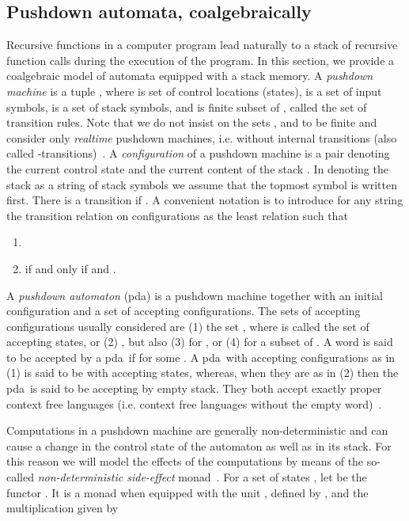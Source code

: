 \documentclass{LMCS}
\begin{document}
\subsection{Pushdown automata, coalgebraically}\label{pda}
\newcommand\pda{{\sc pda}}

Recursive functions in a computer program lead naturally to a stack of recursive function
calls during the execution of the program. In this section, we provide a coalgebraic model
of automata equipped with a stack memory. A \emph{pushdown machine} is a tuple ,
where  is set of control locations (states),  is a set of input symbols,  is a set of stack symbols,
and  is finite subset of , called the set of
transition rules. Note that we do not insist on the sets ,  and  to be finite and
consider only \emph{realtime} pushdown machines, i.e. without internal
transitions (also called -transitions)~\cite{HU79}. A {\em configuration} 
of a pushdown machine  is a pair  denoting the current control state
 and the current content of the stack . In denoting the
stack as a string of stack symbols we assume that the topmost symbol is written
first. There is a transition  if .
A convenient notation is to introduce for any string  the transition relation on configurations
as the least relation such that
\begin{enumerate}[(1)]
\item 
\item  if and only if  and .
\end{enumerate}
A \emph{pushdown automaton} (\pda) is a pushdown machine together with an initial configuration  and a
set  of accepting configurations. The sets of accepting configurations usually considered are
(1)  the set , where  is called the set of accepting states, or
(2) , but also (3)  for , or
(4)  for  a subset of .
A word  is said to be accepted by  a \pda\  if
  for some . A \pda\ with accepting configurations as in (1)
is said to be with accepting states, whereas, when they are as in (2) then the \pda\ is said to be 
accepting by empty stack. They both accept exactly proper context free languages (i.e. context 
free languages without the empty word)~\cite{ABB97}. 

Computations in a pushdown machine are generally non-deterministic and can cause a change in
the control state of the automaton as well as in its stack. For this reason we will model
the effects of the computations by means of the so-called \emph{non-deterministic side-effect}
monad~\cite{BHM00}. For a set of states , let  be the functor . It is a
monad when equipped with the unit , defined by ,
and the multiplication  given by
\end{document}
